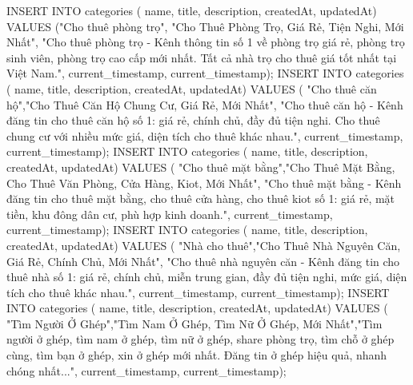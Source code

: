INSERT INTO categories ( name, title, description, createdAt, updatedAt) VALUES ("Cho thuê phòng trọ", "Cho Thuê Phòng Trọ, Giá Rẻ, Tiện Nghi, Mới Nhất", "Cho thuê phòng trọ - Kênh thông tin số 1 về phòng trọ giá rẻ, phòng trọ sinh viên, phòng trọ cao cấp mới nhất. Tất cả nhà trọ cho thuê giá tốt nhất tại Việt Nam.", current_timestamp, current_timestamp);
INSERT INTO categories ( name, title, description, createdAt, updatedAt) VALUES ( "Cho thuê căn hộ","Cho Thuê Căn Hộ Chung Cư, Giá Rẻ, Mới Nhất", "Cho thuê căn hộ - Kênh đăng tin cho thuê căn hộ số 1: giá rẻ, chính chủ, đầy đủ tiện nghi. Cho thuê chung cư với nhiều mức giá, diện tích cho thuê khác nhau.", current_timestamp, current_timestamp);
INSERT INTO categories ( name, title, description, createdAt, updatedAt) VALUES ( "Cho thuê mặt bằng","Cho Thuê Mặt Bằng, Cho Thuê Văn Phòng, Cửa Hàng, Kiot, Mới Nhất", "Cho thuê mặt bằng - Kênh đăng tin cho thuê mặt bằng, cho thuê cửa hàng, cho thuê kiot số 1: giá rẻ, mặt tiền, khu đông dân cư, phù hợp kinh doanh.", current_timestamp, current_timestamp);
INSERT INTO categories ( name, title, description, createdAt, updatedAt) VALUES ( "Nhà cho thuê","Cho Thuê Nhà Nguyên Căn, Giá Rẻ, Chính Chủ, Mới Nhất", "Cho thuê nhà nguyên căn - Kênh đăng tin cho thuê nhà số 1: giá rẻ, chính chủ, miễn trung gian, đầy đủ tiện nghi, mức giá, diện tích cho thuê khác nhau.", current_timestamp, current_timestamp);
INSERT INTO categories ( name, title, description, createdAt, updatedAt) VALUES ( "Tìm Người Ở Ghép","Tìm Nam Ở Ghép, Tìm Nữ Ở Ghép, Mới Nhất","Tìm người ở ghép, tìm nam ở ghép, tìm nữ ở ghép, share phòng trọ, tìm chỗ ở ghép cùng, tìm bạn ở ghép, xin ở ghép mới nhất. Đăng tin ở ghép hiệu quả, nhanh chóng nhất...", current_timestamp, current_timestamp);